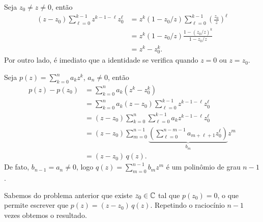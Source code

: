 \begin{questions}
\begin{solution}
    Seja $z_0\neq z\neq 0$, então
    \begin{align*}
        (z-z_0) \sum_{\ell=0}^{k-1} z^{k-1-\ell} z_0^\ell 
            &= z^k (1-z_0/z) \sum_{\ell=0}^{k-1} \left(\frac{z_0}{z}\right)^\ell\\
            &= z^k(1-z_0/z) \frac{1-(z_0/z)^k}{1-z_0/z} \\
            &= z^k-z_0^k.
    \end{align*}
    Por outro lado, é imediato que a identidade se verifica quando $z=0$ ou $z=z_0$.
    
    Seja $p(z) = \sum_{k=0}^n a_k z^k$, $a_n\neq 0$, então
    \begin{align*}
        p(z) - p(z_0) &= \sum_{k=0}^n a_k (z^k - z_0^k)\\
            &= \sum_{k=0}^n a_k (z - z_0)\sum_{\ell=0}^{k-1} z^{k-1-\ell} z_0^\ell \\
            &= (z - z_0) \sum_{k=0}^n \sum_{\ell=0}^{k-1} a_k z^{k-1-\ell} z_0^\ell \\
            &= (z - z_0) \sum_{m=0}^{n-1} \underbrace{\left(\sum_{\ell=0}^{n-m-1} a_{m+\ell+1} z_0^\ell\right)}_{b_m} z^{m} \\
            &= (z-z_0)\,q(z).
    \end{align*}
    De fato, $b_{n-1} = a_n \neq 0$, logo $q(z) = \sum_{m=0}^{n-1} b_m z^m$ é um polinômio de grau $n-1$.
    
    Sabemos do problema anterior que existe $z_0\in{\mathbb C}$ tal que $p(z_0) = 0$, o que permite escrever que ${p(z) = (z-z_0)\,q(z)}$. Repetindo o raciocínio $n-1$ vezes obtemos o resultado.
\end{solution}

\end{questions}
